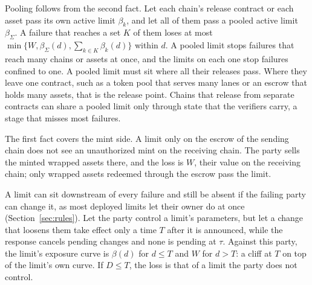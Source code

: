 \documentclass[conference,compsoc]{IEEEtran}
\numberwithin{equation}{section}
\theoremstyle{plain}
\theoremstyle{definition}
\theoremstyle{remark}
\begin{document}
Pooling follows from the second fact. Let each chain's release contract or each asset pass its own active limit $\beta_k$, and let all of them pass a pooled active limit $\beta_\Sigma$. A failure that reaches a set $K$ of them loses at most $\min\{W, \beta_\Sigma(d), \sum_{k \in K} \beta_k(d)\}$ within $d$. A pooled limit stops failures that reach many chains or assets at once, and the limits on each one stop failures confined to one. A pooled limit must sit where all their releases pass. Where they leave one contract, such as a token pool that serves many lanes or an escrow that holds many assets, that is the release point. Chains that release from separate contracts can share a pooled limit only through state that the verifiers carry, a stage that misses most failures.

The first fact covers the mint side. A limit only on the escrow of the sending chain does not see an unauthorized mint on the receiving chain. The party sells the minted wrapped assets there, and the loss is $W$, their value on the receiving chain; only wrapped assets redeemed through the escrow pass the limit.

A limit can sit downstream of every failure and still be absent if the failing party can change it, as most deployed limits let their owner do at once (Section~\ref{sec:rules}). Let the party control a limit's parameters, but let a change that loosens them take effect only a time $T$ after it is announced, while the response cancels pending changes and none is pending at $\tau$. Against this party, the limit's exposure curve is $\beta(d)$ for $d \le T$ and $W$ for $d > T$: a cliff at $T$ on top of the limit's own curve. If $D \le T$, the loss is that of a limit the party does not control.
\end{document}
